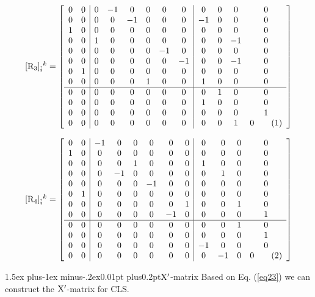\documentclass[12pt]{article}
\makeatletter
\newcommand\numberthis{\addtocounter{equation}{1}\tag{\theequation}}
\let\bm\relax
\newcommand{\bm}[1]{{\boldsymbol{#1}}}
\def\subsubsection{\@startsection{subsubsection}{3}{\z@}
          {1.5ex plus-1ex minus-.2ex}{0.01pt plus0.2pt}{\sf\boldmath}}
\makeatother
\begin{document}
\[[{\bm{\rm R}_3}]_{\hat i}{}^{k} = \left[\begin{array}{cc|cccccc|cccc}
 0 & 0 & 0 & -1 & 0 & 0 & 0 & 0 & 0 & 0 & 0 & 0 \\
 0 & 0 & 0 & 0 & -1 & 0 & 0 & 0 & -1 & 0 & 0 & 0 \\
 1 & 0 & 0 & 0 & 0 & 0 & 0 & 0 & 0 & 0 & 0 & 0 \\
 0 & 0 & 1 & 0 & 0 & 0 & 0 & 0 & 0 & 0 & -1 & 0 \\
 0 & 0 & 0 & 0 & 0 & 0 & -1 & 0 & 0 & 0 & 0 & 0 \\
 0 & 0 & 0 & 0 & 0 & 0 & 0 & -1 & 0 & 0 & -1 & 0 \\
 0 & 1 & 0 & 0 & 0 & 0 & 0 & 0 & 0 & 0 & 0 & 0 \\
 0 & 0 & 0 & 0 & 0 & 1 & 0 & 0 & 1 & 0 & 0 & 0 \\
 \hline
 0 & 0 & 0 & 0 & 0 & 0 & 0 & 0 & 0 & 1 & 0 & 0 \\
 0 & 0 & 0 & 0 & 0 & 0 & 0 & 0 & 1 & 0 & 0 & 0 \\
 0 & 0 & 0 & 0 & 0 & 0 & 0 & 0 & 0 & 0 & 0 & 1 \\
 0 & 0 & 0 & 0 & 0 & 0 & 0 & 0 & 0 & 0 & 1 & 0
\numberthis\end{array}\right] \]

\[[{\bm{\rm R}_4}]_{\hat i}{}^{k} = \left[\begin{array}{cc|cccccc|cccc}
 0 & 0 & -1 & 0 & 0 & 0 & 0 & 0 & 0 & 0 & 0 & 0 \\
 1 & 0 & 0 & 0 & 0 & 0 & 0 & 0 & 0 & 0 & 0 & 0 \\
 0 & 0 & 0 & 0 & 1 & 0 & 0 & 0 & 1 & 0 & 0 & 0 \\
 0 & 0 & 0 & -1 & 0 & 0 & 0 & 0 & 0 & 1 & 0 & 0 \\
 0 & 0 & 0 & 0 & 0 & -1 & 0 & 0 & 0 & 0 & 0 & 0 \\
 0 & 1 & 0 & 0 & 0 & 0 & 0 & 0 & 0 & 0 & 0 & 0 \\
 0 & 0 & 0 & 0 & 0 & 0 & 0 & 1 & 0 & 0 & 1 & 0 \\
 0 & 0 & 0 & 0 & 0 & 0 & -1 & 0 & 0 & 0 & 0 & 1 \\
 \hline
 0 & 0 & 0 & 0 & 0 & 0 & 0 & 0 & 0 & 0 & 1 & 0 \\
 0 & 0 & 0 & 0 & 0 & 0 & 0 & 0 & 0 & 0 & 0 & 1 \\
 0 & 0 & 0 & 0 & 0 & 0 & 0 & 0 & -1 & 0 & 0 & 0 \\
 0 & 0 & 0 & 0 & 0 & 0 & 0 & 0 & 0 & -1 & 0 & 0 
\numberthis\end{array}\right] \]

\subsubsection{$\bm{\rm X'}$-matrix}
Based on Eq. (\ref{eq23}) we can construct the $\bm{\rm{X'}}$-matrix for CLS.
\end{document}

